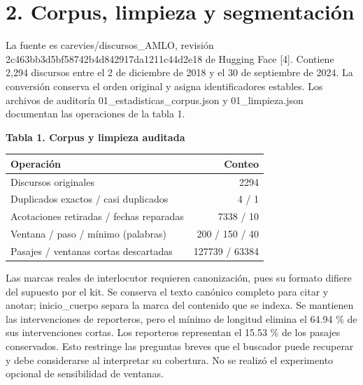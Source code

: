 \documentclass[11pt,a4paper]{article}
\begin{document}
\section*{2. Corpus, limpieza y segmentación}
\par
La fuente es carevies/\allowbreak{}discursos\_\allowbreak{}AMLO, revisión 2c463bb3d5\allowbreak{}bf58742b4d\allowbreak{}842917da12\allowbreak{}11c44d2e18 de Hugging Face [4]. Contiene 2,294 discursos entre el 2 de diciembre de 2018 y el 30 de septiembre de 2024. La conversión conserva el orden original y asigna identificadores estables. Los archivos de auditoría 01\_\allowbreak{}estadisticas\_\allowbreak{}corpus.json y 01\_\allowbreak{}limpieza.json documentan las operaciones de la tabla 1.
\par
\par\medskip\noindent\begin{minipage}{\linewidth}
\textbf{Tabla 1. Corpus y limpieza auditada}\par\smallskip
\begin{tabularx}{\linewidth}{@{}Yr@{}}\toprule
Operación & Conteo \\ \midrule
Discursos originales & 2294 \\
Duplicados exactos /\allowbreak{} casi duplicados & 4 /\allowbreak{} 1 \\
Acotaciones retiradas /\allowbreak{} fechas reparadas & 7338 /\allowbreak{} 10 \\
Ventana /\allowbreak{} paso /\allowbreak{} mínimo (palabras) & 200 /\allowbreak{} 150 /\allowbreak{} 40 \\
Pasajes /\allowbreak{} ventanas cortas descartadas & 127739 /\allowbreak{} 63384 \\
\bottomrule\end{tabularx}\end{minipage}\par\medskip
\par
Las marcas reales de interlocutor requieren canonización, pues su formato difiere del supuesto por el kit. Se conserva el texto canónico completo para citar y anotar; inicio\_\allowbreak{}cuerpo separa la marca del contenido que se indexa. Se mantienen las intervenciones de reporteros, pero el mínimo de longitud elimina el 64.94 \% de sus intervenciones cortas. Los reporteros representan el 15.53 \% de los pasajes conservados. Esto restringe las preguntas breves que el buscador puede recuperar y debe considerarse al interpretar su cobertura. No se realizó el experimento opcional de sensibilidad de ventanas.
\par
\newpage
\par
\end{document}

